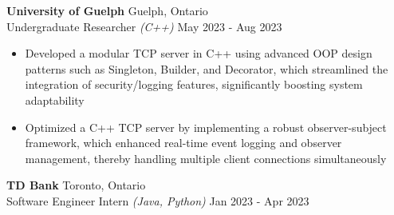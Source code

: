\documentclass[a4paper]{article}
\begin{document}
\textbf{University of Guelph} 
\hfill Guelph, Ontario\\
Undergraduate Researcher {\sl (C++)} \hfill May 2023 - Aug 2023\\
\vspace{-1mm}
\begin{itemize} \itemsep 1pt
	\item Developed a modular TCP server in C++ using advanced OOP design patterns such as Singleton, Builder, and Decorator, which streamlined the integration of security/logging features, significantly boosting system adaptability
        \item Optimized a C++ TCP server by implementing a robust observer-subject framework, which enhanced real-time event logging and observer management, thereby handling multiple client connections simultaneously

\end{itemize}

\textbf{TD Bank} 
\hfill 
Toronto, Ontario \\
Software Engineer Intern {\sl (Java, Python)} \hfill Jan 2023 - Apr 2023 \\
\vspace{-1mm}
\end{document}
